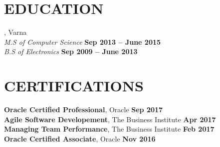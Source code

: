 \documentclass[margin,line]{resume}
\begin{document}
\begin{resume}
\sectionline%

    \section{\mysidestyle\textbf{\large{E}\small{DUCATION}}}

    \textbf{}, Varna \vspace{2mm}\\\vspace{1mm}%
    \textsl{M.S of Computer Science} \hfill \textbf{ Sep 2013 {--} June 2015}\\
    \textsl{B.S of Electronics} \hfill \textbf{ Sep 2009 {--} June 2013}\\

\sectionline%

    \section{\mysidestyle\textbf{\large{C}\small{ERTIFICATIONS}}}

    \textbf{Oracle Certified Professional}, Oracle \hfill \textbf{Sep 2017} \vspace{2mm}\\\vspace{1mm}%
    \textbf{Agile Software Developement}, The Business Institute \hfill \textbf{Apr 2017} \vspace{2mm}\\\vspace{1mm}%
    \textbf{Managing Team Performance}, The Business Institute \hfill \textbf{Feb 2017} \vspace{2mm}\\\vspace{1mm}%
    \textbf{Oracle Certified Associate}, Oracle \hfill \textbf{Nov 2016} \vspace{2mm}\\\vspace{1mm}%

\end{resume}
\end{document}
